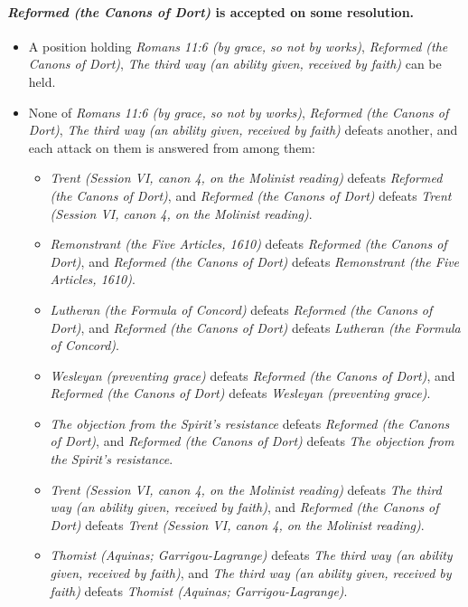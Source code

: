 \documentclass[11pt]{article}
\begin{document}
\paragraph{\emph{Reformed (the Canons of Dort)} is accepted on some resolution.}
\begin{itemize}
\item A position holding \emph{Romans 11:6 (by grace, so not by works)}, \emph{Reformed (the Canons of Dort)}, \emph{The third way (an ability given, received by faith)} can be held.
\item None of \emph{Romans 11:6 (by grace, so not by works)}, \emph{Reformed (the Canons of Dort)}, \emph{The third way (an ability given, received by faith)} defeats another, and each attack on them is answered from among them:
\begin{itemize}
\item \emph{Trent (Session VI, canon 4, on the Molinist reading)} defeats \emph{Reformed (the Canons of Dort)}, and \emph{Reformed (the Canons of Dort)} defeats \emph{Trent (Session VI, canon 4, on the Molinist reading)}.
\item \emph{Remonstrant (the Five Articles, 1610)} defeats \emph{Reformed (the Canons of Dort)}, and \emph{Reformed (the Canons of Dort)} defeats \emph{Remonstrant (the Five Articles, 1610)}.
\item \emph{Lutheran (the Formula of Concord)} defeats \emph{Reformed (the Canons of Dort)}, and \emph{Reformed (the Canons of Dort)} defeats \emph{Lutheran (the Formula of Concord)}.
\item \emph{Wesleyan (preventing grace)} defeats \emph{Reformed (the Canons of Dort)}, and \emph{Reformed (the Canons of Dort)} defeats \emph{Wesleyan (preventing grace)}.
\item \emph{The objection from the Spirit’s resistance} defeats \emph{Reformed (the Canons of Dort)}, and \emph{Reformed (the Canons of Dort)} defeats \emph{The objection from the Spirit’s resistance}.
\item \emph{Trent (Session VI, canon 4, on the Molinist reading)} defeats \emph{The third way (an ability given, received by faith)}, and \emph{Reformed (the Canons of Dort)} defeats \emph{Trent (Session VI, canon 4, on the Molinist reading)}.
\item \emph{Thomist (Aquinas; Garrigou-Lagrange)} defeats \emph{The third way (an ability given, received by faith)}, and \emph{The third way (an ability given, received by faith)} defeats \emph{Thomist (Aquinas; Garrigou-Lagrange)}.
\end{itemize}
\end{itemize}
\end{document}
